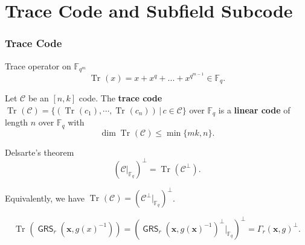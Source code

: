\documentclass[
10pt, %
%
aspectratio=169, %
]{beamer}
\theoremstyle{plain}%
\theoremstyle{definition}
\theoremstyle{remark}
\newcommand{\calC}{\mathcal{C}}
\newcommand{\fq}{\mathbb{F}_{q}}
\newcommand{\Tr}[1]{\operatorname{Tr}_{}\left(#1\right)}
\newcommand{\GRS}{\operatorname{\mathsf{GRS}}}
\begin{document}
\section{Trace Code and Subfield Subcode}
\begin{frame}
	\frametitle{Trace Code}
	\begin{block}{Trace operator on $\mathbb{F}_{q^m}$}
		\[\Tr{x} = x + x^q + ... + x^{q^{m-1}} \in \fq.\]
	\end{block}

Let $\calC$ be an $[n,k]$ code. The \textbf{trace code} $\Tr{\calC}=\{(\Tr{c_1},\cdots,\Tr{c_n})\,|\, c\in \calC\}$ over $\fq$ is a \textbf{linear code} of length $n$ over $\fq$ with
\[\dim \Tr{\calC} \leq \min\{mk,n\}.\]	
\vspace{-1.2em}
\begin{block}{Delsarte's theorem}
	\[\left(\calC|_{\fq}\right)^{\perp} = \Tr{\calC^{\perp}}.\]
\end{block}
Equivalently, we have $\Tr{\calC}= \left(\calC^{\perp}|_{\fq}\right)^{\perp}$.
\vspace{-0.5em}
\begin{tcolorbox}[colback=gold]
	\[\Tr{\GRS_r(\mathbf{x},g(x)^{-1})} =( \GRS_r(\mathbf{x},g(\mathbf{x})^{-1})^\perp|_{\fq})^\perp= \Gamma_r(\mathbf{x},g)^{\perp}.\]
\end{tcolorbox}
\end{frame}
\end{document}
